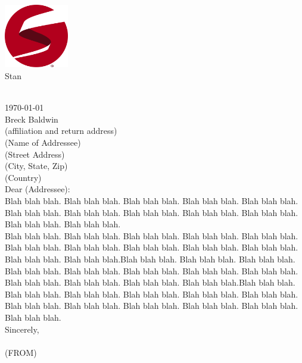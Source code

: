 \documentclass[11pt]{article}
\begin{document}
\pagestyle{empty}
\vspace*{-0.6in}
\mbox{ }
\hfill
\begin{minipage}{1.2in}
\begin{center}
\includegraphics[width=1.1in]{stan_logo.png}
\\[-3pt]
\Huge{\sf Stan}
\end{center}
\end{minipage}
\\[-1in]
\today
\\[0.1in]
Breck Baldwin
\\
(affiliation and return address)
\\[0.5in]
(Name of Addressee)
\\
(Street Address)
\\
(City, State, Zip)
\\
(Country)
\\[0.25in]
Dear (Addressee):
\\[0.1in]
Blah blah blah.
Blah blah blah.
Blah blah blah.
Blah blah blah.
Blah blah blah.
Blah blah blah.
Blah blah blah.
Blah blah blah.
Blah blah blah.
Blah blah blah.
Blah blah blah.
Blah blah blah.
\\[0.1in]
Blah blah blah.
Blah blah blah.
Blah blah blah.
Blah blah blah.
Blah blah blah.
Blah blah blah.
Blah blah blah.
Blah blah blah.
Blah blah blah.
Blah blah blah.
Blah blah blah.
Blah blah blah.Blah blah blah.
Blah blah blah.
Blah blah blah.
Blah blah blah.
Blah blah blah.
Blah blah blah.
Blah blah blah.
Blah blah blah.
Blah blah blah.
Blah blah blah.
Blah blah blah.
Blah blah blah.Blah blah blah.
Blah blah blah.
Blah blah blah.
Blah blah blah.
Blah blah blah.
Blah blah blah.
Blah blah blah.
Blah blah blah.
Blah blah blah.
Blah blah blah.
Blah blah blah.
Blah blah blah.
\\[0.15in]
Sincerely,
\\[0.1in]
\\[0.1in]
(FROM)
\end{document}

